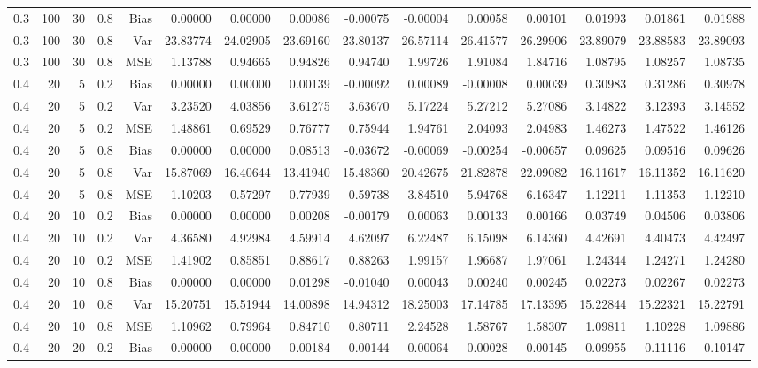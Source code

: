 \begin{table}[!htbp]
\begin{tabular}{lrrrrrrrrrrrrrr}
0.3 & 100 & 30 & 0.8 & Bias & 0.00000 & 0.00000 & 0.00086 & -0.00075 & -0.00004 & 0.00058 & 0.00101 & 0.01993 & 0.01861 & 0.01988 \\
0.3 & 100 & 30 & 0.8 & Var & 23.83774 & 24.02905 & 23.69160 & 23.80137 & 26.57114 & 26.41577 & 26.29906 & 23.89079 & 23.88583 & 23.89093 \\
0.3 & 100 & 30 & 0.8 & MSE & 1.13788 & 0.94665 & 0.94826 & 0.94740 & 1.99726 & 1.91084 & 1.84716 & 1.08795 & 1.08257 & 1.08735 \\
0.4 &  20 &  5 & 0.2 & Bias & 0.00000 & 0.00000 & 0.00139 & -0.00092 & 0.00089 & -0.00008 & 0.00039 & 0.30983 & 0.31286 & 0.30978 \\
0.4 &  20 &  5 & 0.2 & Var & 3.23520 & 4.03856 & 3.61275 & 3.63670 & 5.17224 & 5.27212 & 5.27086 & 3.14822 & 3.12393 & 3.14552 \\
0.4 &  20 &  5 & 0.2 & MSE & 1.48861 & 0.69529 & 0.76777 & 0.75944 & 1.94761 & 2.04093 & 2.04983 & 1.46273 & 1.47522 & 1.46126 \\
0.4 &  20 &  5 & 0.8 & Bias & 0.00000 & 0.00000 & 0.08513 & -0.03672 & -0.00069 & -0.00254 & -0.00657 & 0.09625 & 0.09516 & 0.09626 \\
0.4 &  20 &  5 & 0.8 & Var & 15.87069 & 16.40644 & 13.41940 & 15.48360 & 20.42675 & 21.82878 & 22.09082 & 16.11617 & 16.11352 & 16.11620 \\
0.4 &  20 &  5 & 0.8 & MSE & 1.10203 & 0.57297 & 0.77939 & 0.59738 & 3.84510 & 5.94768 & 6.16347 & 1.12211 & 1.11353 & 1.12210 \\
0.4 &  20 & 10 & 0.2 & Bias & 0.00000 & 0.00000 & 0.00208 & -0.00179 & 0.00063 & 0.00133 & 0.00166 & 0.03749 & 0.04506 & 0.03806 \\
0.4 &  20 & 10 & 0.2 & Var & 4.36580 & 4.92984 & 4.59914 & 4.62097 & 6.22487 & 6.15098 & 6.14360 & 4.42691 & 4.40473 & 4.42497 \\
0.4 &  20 & 10 & 0.2 & MSE & 1.41902 & 0.85851 & 0.88617 & 0.88263 & 1.99157 & 1.96687 & 1.97061 & 1.24344 & 1.24271 & 1.24280 \\
0.4 &  20 & 10 & 0.8 & Bias & 0.00000 & 0.00000 & 0.01298 & -0.01040 & 0.00043 & 0.00240 & 0.00245 & 0.02273 & 0.02267 & 0.02273 \\
0.4 &  20 & 10 & 0.8 & Var & 15.20751 & 15.51944 & 14.00898 & 14.94312 & 18.25003 & 17.14785 & 17.13395 & 15.22844 & 15.22321 & 15.22791 \\
0.4 &  20 & 10 & 0.8 & MSE & 1.10962 & 0.79964 & 0.84710 & 0.80711 & 2.24528 & 1.58767 & 1.58307 & 1.09811 & 1.10228 & 1.09886 \\
0.4 &  20 & 20 & 0.2 & Bias & 0.00000 & 0.00000 & -0.00184 & 0.00144 & 0.00064 & 0.00028 & -0.00145 & -0.09955 & -0.11116 & -0.10147 \\

\end{tabular}
\end{table}

